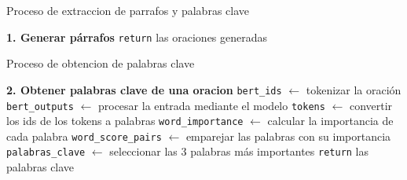 \documentclass{article}
\begin{document}
\begin{algorithm}[H]
\SetAlgoLined
{}

\caption{Proceso de extraccion de parrafos y palabras clave}

\textbf{1. Generar párrafos}\;
\Indp
{}
\texttt{return} las oraciones generadas\;
\Indm
\end{algorithm}

\begin{algorithm}[H]
\SetAlgoLined
{}
\caption{Proceso de obtencion de palabras clave}

\textbf{2. Obtener palabras clave de una oracion}\;
\Indp
\texttt{bert\_ids} $\gets$ tokenizar la oración\;
\texttt{bert\_outputs} $\gets$ procesar la entrada mediante el modelo\;
\texttt{tokens} $\gets$ convertir los ids de los tokens a palabras\;
\texttt{word\_importance} $\gets$ calcular la importancia de cada palabra\;
\texttt{word\_score\_pairs} $\gets$ emparejar las palabras con su importancia\;
\texttt{palabras\_clave} $\gets$ seleccionar las 3 palabras más importantes\;
\texttt{return} las palabras clave\;
\Indm

\end{algorithm}
\end{document}
